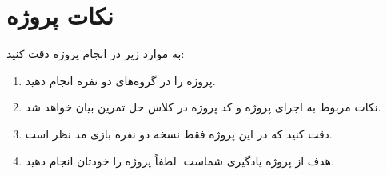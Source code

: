 \documentclass{article}
\begin{document}
\begin{large}
\begin{itemize}
    \end{itemize}

    \section{نکات پروژه }
    به موارد زیر در انجام پروژه دقت کنید:
    \begin{enumerate}
    \item پروژه را در گروه‌های دو نفره انجام دهید.
    \item نکات مربوط به اجرای پروژه و کد پروژه در کلاس حل تمرین بیان خواهد شد.
    \item دقت کنید که در این پروژه فقط نسخه دو نفره بازی مد نظر است.
    \item هدف از پروژه یادگیری شماست. لطفاً پروژه را خودتان انجام دهید.
    
    \end{enumerate}

    
\end{large}

	 
\end{document}
